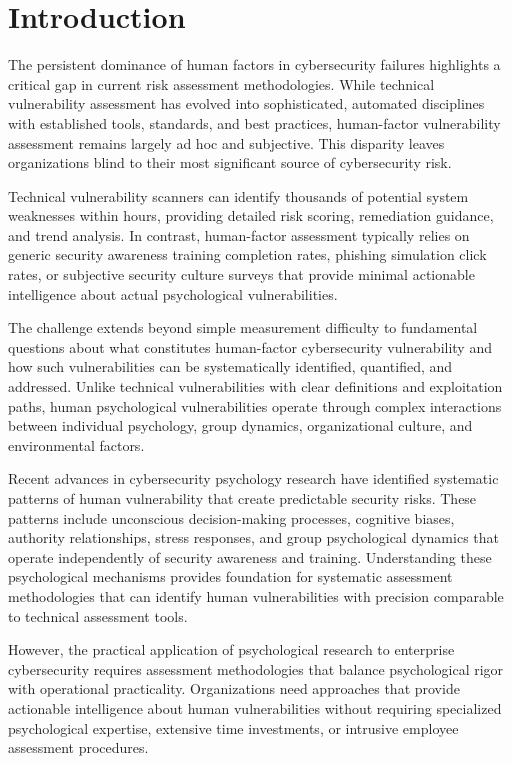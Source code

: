\documentclass[10pt, twocolumn]{article}
\begin{document}
\section{Introduction}

The persistent dominance of human factors in cybersecurity failures highlights a critical gap in current risk assessment methodologies. While technical vulnerability assessment has evolved into sophisticated, automated disciplines with established tools, standards, and best practices, human-factor vulnerability assessment remains largely ad hoc and subjective. This disparity leaves organizations blind to their most significant source of cybersecurity risk.

Technical vulnerability scanners can identify thousands of potential system weaknesses within hours, providing detailed risk scoring, remediation guidance, and trend analysis. In contrast, human-factor assessment typically relies on generic security awareness training completion rates, phishing simulation click rates, or subjective security culture surveys that provide minimal actionable intelligence about actual psychological vulnerabilities.

The challenge extends beyond simple measurement difficulty to fundamental questions about what constitutes human-factor cybersecurity vulnerability and how such vulnerabilities can be systematically identified, quantified, and addressed. Unlike technical vulnerabilities with clear definitions and exploitation paths, human psychological vulnerabilities operate through complex interactions between individual psychology, group dynamics, organizational culture, and environmental factors.

Recent advances in cybersecurity psychology research have identified systematic patterns of human vulnerability that create predictable security risks\cite{canale2024}. These patterns include unconscious decision-making processes, cognitive biases, authority relationships, stress responses, and group psychological dynamics that operate independently of security awareness and training. Understanding these psychological mechanisms provides foundation for systematic assessment methodologies that can identify human vulnerabilities with precision comparable to technical assessment tools.

However, the practical application of psychological research to enterprise cybersecurity requires assessment methodologies that balance psychological rigor with operational practicality. Organizations need approaches that provide actionable intelligence about human vulnerabilities without requiring specialized psychological expertise, extensive time investments, or intrusive employee assessment procedures.
\end{document}
